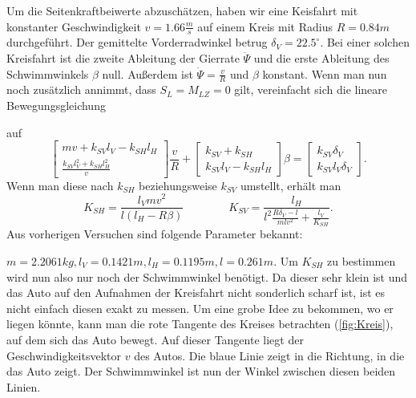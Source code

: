 Um die Seitenkraftbeiwerte abzuschätzen, haben wir eine Keisfahrt mit konstanter Geschwindigkeit $v=1.66\frac{m}{s}$ auf einem Kreis mit Radius $R=0.84m$ durchgeführt. Der gemittelte Vorderradwinkel betrug $\delta_V=22.5^\circ$. Bei einer solchen Kreisfahrt ist die zweite Ableitung der Gierrate $\ddot{\Psi}$ und die erste Ableitung des Schwimmwinkels $ \beta$ null. Außerdem ist $\dot{\Psi}=\frac{v}{R}$ und $\beta$ konstant. Wenn man nun noch zusätzlich annimmt, dass $S_L=M_{LZ}=0$ gilt, vereinfacht sich die lineare Bewegungsgleichung

auf 
$$  
\begin{bmatrix} 
mv+k_{SV}l_V-k_{SH}l_{H} \\
\frac{k_{SV}l_V^2+k_{SH}l_H^2}{v}  
\end{bmatrix} \frac{v}{R}+
\begin{bmatrix} 
k_{SV}+k_{SH} \\
k_{SV}l_V-k_{SH}l_H 
\end{bmatrix} \beta=
\begin{bmatrix} 
k_{SV}\delta_V \\
k_{SV}l_V\delta_V 
\end{bmatrix}.
$$
Wenn man diese nach $k_{SH}$ beziehungsweise $k_{SV}$ umstellt, erhält man 
$$
K_{SH}=\frac{l_V mv^2}{l(l_H-R\beta)} \qquad \qquad K_{SV}=\frac{l_H}{l^2\frac{R\delta_V-l}{mlv^2}+\frac{l_V}{K_{SH}}}.
$$
Aus vorherigen Versuchen sind folgende Parameter bekannt:

$m=2.2061 kg,l_V=0.1421 m,l_H=0.1195 m,l=0.261 m$. Um $K_{SH}$ zu bestimmen wird nun also nur noch der Schwimmwinkel benötigt. Da dieser sehr klein ist und das Auto auf den Aufnahmen der Kreisfahrt nicht sonderlich scharf ist, ist es nicht einfach diesen exakt zu messen. Um eine grobe Idee zu bekommen, wo er liegen könnte, kann man die rote Tangente des Kreises betrachten (\ref{fig:Kreis}), auf dem sich das Auto bewegt. Auf dieser Tangente liegt der Geschwindigkeitsvektor $v$ des Autos. Die blaue Linie zeigt in die Richtung, in die das Auto zeigt. Der Schwimmwinkel ist nun der Winkel zwischen diesen beiden Linien. 

